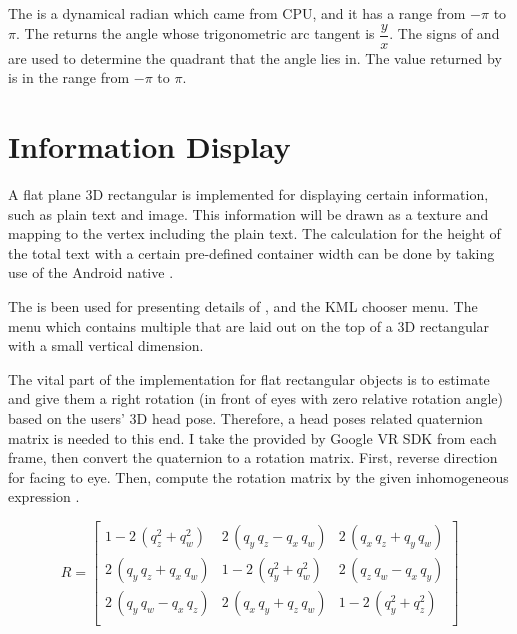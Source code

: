 The  is a dynamical radian which came from CPU, and it has a range from $-\pi$ to $\pi$. The  returns the angle whose trigonometric arc tangent is $\dfrac{y}{x}$. The signs of  and  are used to determine the quadrant that the angle lies in. The value returned by  is in the range from $-\pi$ to $\pi$.

\section{Information Display}

A flat plane 3D rectangular  is implemented for displaying certain information, such as plain text and image. This information will be drawn as a texture and mapping to the  vertex including the plain text. The calculation for the height of the total text with a certain pre-defined container width can be done by taking use of the Android native . 

The  is been used for presenting details of , and the KML chooser menu. The menu which contains multiple  that are laid out on the top of a 3D rectangular  with a small vertical dimension.

The vital part of the implementation for flat rectangular objects is to estimate and give them a right rotation (in front of eyes with zero relative rotation angle) based on the users' 3D head pose. Therefore, a head poses related quaternion matrix \cite{jvv.quaternions.2013} is needed to this end. I take the   provided by Google VR SDK from each frame, then convert the quaternion to a rotation matrix. First, reverse direction  for facing to eye. Then, compute the rotation matrix by the given inhomogeneous expression \cite{wiki.quaternion-mat.2016}.

\begin{equation}
\label{equ:quaternion-matrix}
R = 
	\begin{bmatrix}
	1 - 2\,(q_z^2 + q_w^2) & 2\,(q_y\,q_z - q_x\,q_w) & 2\,(q_x\,q_z + q_y\,q_w)\\
	2\,(q_y\,q_z + q_x\,q_w) & 1 - 2\,(q_y^2 + q_w^2) & 2\,(q_z\,q_w - q_x\,q_y)\\
	2\,(q_y\,q_w - q_x\,q_z) & 2\,(q_x\,q_y + q_z\,q_w) & 1 - 2\,(q_y^2 + q_z^2)\\
	\end{bmatrix}
\end{equation}

